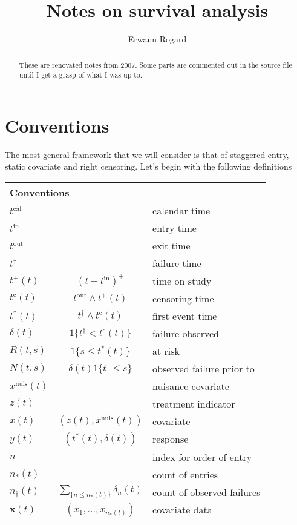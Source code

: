 \documentclass{article}
\title{Notes on survival analysis}
\author{Erwann Rogard}
\date{\ThisDate}
\newcommand{\tcal}{t^{\mathrm{cal}}}
\newcommand{\tcaldef}{calendar time}
\newcommand{\tobsdef}{observation time}
\newcommand{\tfail}{t^{\dag}}
\newcommand{\tfaildef}{failure time}
\newcommand{\tentry}{t^{\mathrm{in}}}
\newcommand{\tentrydef}{entry time}
\newcommand{\texit}{t^{\mathrm{out}}}
\newcommand{\texitdef}{exit time}
\newcommand{\tonstudy}{t^{+}}
\newcommand{\tonstudydef}{time on study}
\newcommand{\tonstudyformula}[1]{(#1-\tentry)^{+}}
\newcommand{\tcens}{t^{\mathrm{c}}}
\newcommand{\tcensdef}{censoring time}
\newcommand{\tcensformula}[1]{\texit \wedge \tonstudy(#1)}
\newcommand{\tobs}{t^{\mathrm{obs}}}
\newcommand{\tmin}{t^{*}}
\newcommand{\tmindef}{first event time}
\newcommand{\tminformula}[1]{\tfail \wedge \tcens(#1)}
\newcommand{\isfail}{\delta}
\newcommand{\isfaildef}{failure observed}
\newcommand{\isfailformula}[1]{1\{\tfail<\tcens(#1)\}}
\newcommand{\atrisk}{R}
\newcommand{\atriskdef}{at risk}
\newcommand{\atriskformula}[2]{1\{#2\leq\tmin(#1)\}}
\newcommand{\unitcount}{N}
\newcommand{\unitcountdef}{observed failure prior to}
\newcommand{\unitcountformula}[2]{\isfail(#1)1\{\tfail\leq #2\}}
\newcommand{\survresp}{y}
\newcommand{\survrespdef}{response}
\newcommand{\survrespformula}[1]{(\tmin(#1),\isfail(#1))}
\newcommand{\survnuiscov}{x^{\mathrm{nuis}}}
\newcommand{\survnuiscovdef}{nuisance covariate}
\newcommand{\survfullcov}{x}
\newcommand{\survfullcovdef}{covariate}
\newcommand{\survfullcovformula}[1]{(\treatindic(#1),\survnuiscov(#1))}
\newcommand{\nentry}{n}
\newcommand{\nentrydef}{index for order of entry}
\newcommand{\nentries}{n_*}
\newcommand{\nentriesdef}{count of entries}
\newcommand{\nfailed}{n_{\dag}}
\newcommand{\nfaileddef}{count of observed failures}
\newcommand{\nfailedformula}[1]{\sum_{\{n\leq \nentries(#1)\}} \isfail_n(#1)}
\newcommand{\survcovmat}{\mathbf{x}}
\newcommand{\survcovmatdef}{covariate data}
\newcommand{\survcovmatformula}[1]{(\survfullcov_1,...,\survfullcov_{\nentries(#1)})}
\newcommand{\treatindic}{z}
\newcommand{\treatindicdef}{treatment indicator}
\begin{document}
\maketitle

\begin{abstract}These are renovated notes from 2007. Some parts are commented out in the source file until I get a grasp of what I was up to.\end{abstract}

\section{Conventions}
The most general framework that we will consider is that of staggered entry, static covariate and right censoring.  Let's begin with the following definitions
\begin{center}
\begin{tabular}{|l|c|l|}\hline
\multicolumn{3}{|l|}{Conventions}\\\hline
$\tcal$ & &\tcaldef \\
\hline
$\tentry$ & &\tentrydef\\
$\texit$ & &\texitdef\\
$\tfail$ & &\tfaildef\\
$\tonstudy(t)$ &  $\tonstudyformula{t}$ & \tonstudydef\\
$\tcens(t)$ & $\tcensformula{t}$ & \tcensdef  \\
$\tmin(t)$ & $\tminformula{t}$ & \tmindef\\
$\isfail(t)$ & $\isfailformula{t}$ &\isfaildef \\
$\atrisk(t,s)$ & $\atriskformula{t}{s}$ &\atriskdef\\
$\unitcount(t,s)$ & $\unitcountformula{t}{s}$ & \unitcountdef\\
$\survnuiscov(t)$ &  & \survnuiscovdef\\
$\treatindic(t)$ & & \treatindicdef\\
$\survfullcov(t)$ & $\survfullcovformula{t}$ & \survfullcovdef\\
$\survresp(t)$ & $\survrespformula{t}$ & \survrespdef\\
\hline
$\nentry$ &  &\nentrydef\\
$\nentries(t)$ &  & \nentriesdef\\
$\nfailed(t)$ & $\nfailedformula{t}$ &\nfaileddef\\
$\survcovmat(t)$ & $\survcovmatformula{t}$ & \survcovmatdef\\

\end{tabular}
\end{center}
\end{document}

